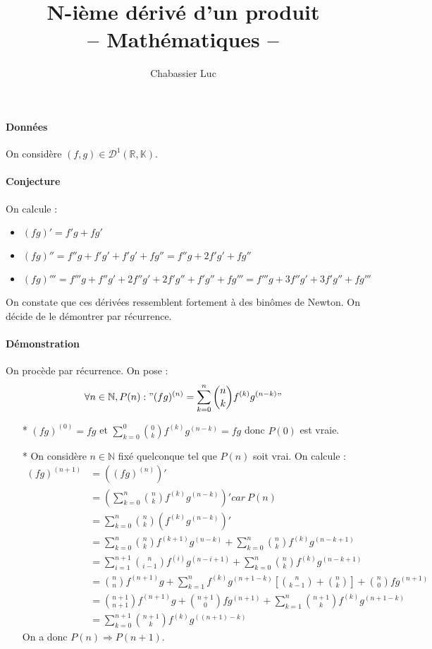 \documentclass{article}
\title{N-ième dérivé d'un produit\\-- Mathématiques --}
\author{Chabassier Luc}
\begin{document}
\maketitle

\paragraph{Données} On considère $(f,g) \in \mathcal{D}^1(\mathbb{R},\mathbb{K})$.

\paragraph{Conjecture} On calcule : \begin{itemize}
    \item $(fg)' = f'g + fg'$
    \item $(fg)'' = f''g + f'g' + f'g' + fg'' = f''g + 2f'g' + fg''$
    \item $(fg)''' = f'''g + f''g' + 2f''g' + 2f'g'' + f'g'' + fg''' = f'''g + 3f''g' + 3f'g'' + fg'''$
\end{itemize}
On constate que ces dérivées ressemblent fortement à des binômes de Newton. On décide de le démontrer par récurrence.

\paragraph{Démonstration} On procède par récurrence. On pose :
\[ \forall n \in \mathbb{N}, P(n) : "(fg)^{(n)} = \sum_{k=0}^n{n\choose k} f^{(k)}g^{(n-k)}" \]

\begin{itemize}
    \item[*] $(fg)^{(0)} = fg$ et $\sum_{k=0}^0{0\choose k} f^{(k)}g^{(n-k)} = fg$ donc $P(0)$ est vraie.
    \item[*] On considère $n\in\mathbb{N}$ fixé quelconque tel que $P(n)$ soit vrai. On calcule : \begin{align*}
            (fg)^{(n+1)} &= \left((fg)^{(n)}\right)' \\
                         &= \left(\sum_{k=0}^n{n\choose k}f^{(k)}g^{(n-k)}\right)' car\ P(n) \\
                         &= \sum_{k=0}^n{n\choose k}\left(f^{(k)}g^{(n-k)}\right)' \\
                         &= \sum_{k=0}^n{n\choose k}f^{(k+1)}g^{(n-k)} + \sum_{k=0}^n{n\choose k}f^{(k)}g^{(n-k+1)} \\
                         &= \sum_{i=1}^{n+1}{n\choose i-1}f^{(i)}g^{(n-i+1)} + \sum_{k=0}^n{n\choose k}f^{(k)}g^{(n-k+1)} \\ 
                         &= {n\choose n}f^{(n+1)}g + \sum_{k=1}^nf^{(k)}g^{(n+1-k)}\left[{n\choose k-1} + {n\choose k}\right] + {n\choose 0}fg^{(n+1)} \\
                         &= {n+1\choose n+1}f^{(n+1)}g + {n+1\choose 0}fg^{(n+1)} + \sum_{k=1}^n{n+1\choose k}f^{(k)}g^{(n+1-k)} \\
                         &= \sum_{k=0}^{n+1}{n+1\choose k}f^{(k)}g^{((n+1) - k)}
        \end{align*}
        On a donc $P(n) \Rightarrow P(n+1)$.
\end{itemize}
\end{document}
